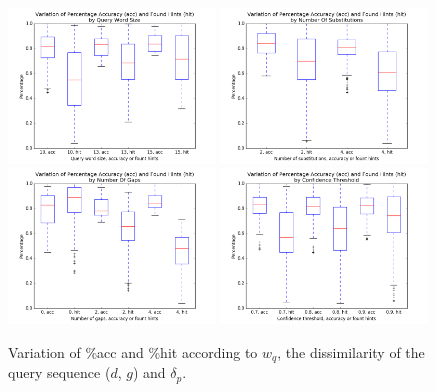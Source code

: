 \documentclass{article}
\begin{document}
\begin{figure}[tbp]
\begin{center}
\caption{Variation of \%acc and \%hit according to $w_q$, the dissimilarity of the query sequence ($d$, $g$) and $\delta_p$.}
   \includegraphics[width=0.49\textwidth]{size}
   \includegraphics[width=0.49\textwidth]{diff}
   \includegraphics[width=0.49\textwidth]{gap}
   \includegraphics[width=0.49\textwidth]{conf}
\label{figure:box_plots}
\end{center}
\end{figure}
\end{document}
